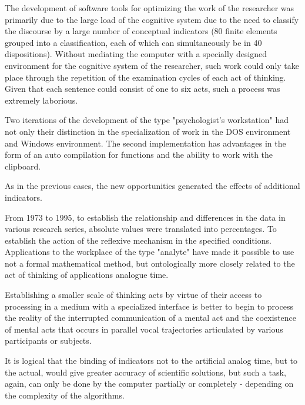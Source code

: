 \documentclass[conference]{IEEEtran}
\begin{document}
	The development of software tools for optimizing the work of the researcher was primarily due to the large load of the cognitive system due to the need to classify the discourse by a large number of conceptual indicators (80 finite elements grouped into a classification, each of which can simultaneously be in 40 dispositions). Without mediating the computer with a specially designed environment for the cognitive system of the researcher, such work could only take place through the repetition of the examination cycles of each act of thinking. Given that each sentence could consist of one to six acts, such a process was extremely laborious.
	
	Two iterations of the development of the type "psychologist's workstation" \cite{b7,b14} had not only their distinction in the specialization of work in the DOS environment and Windows environment. The second implementation has advantages in the form of an auto compilation for functions and the ability to work with the clipboard.
	
	As in the previous cases, the new opportunities generated the effects of additional indicators.
	
	From 1973 to 1995, to establish the relationship and differences in the data in various research series, absolute values were translated into percentages. To establish the action of the reflexive mechanism in the specified conditions. Applications to the workplace of the type "analyte" \cite{b1} have made it possible to use not a formal mathematical method, but ontologically more closely related to the act of thinking of applications analogue time.
	
	Establishing a smaller scale of thinking acts by virtue of their access to processing in a medium with a specialized interface is better to begin to process the reality of the interrupted communication of a mental act and the coexistence of mental acts that occurs in parallel vocal trajectories articulated by various participants or subjects.
	
	It is logical that the binding of indicators not to the artificial analog time, but to the actual, would give greater accuracy of scientific solutions, but such a task, again, can only be done by the computer partially or completely - depending on the complexity of the algorithms.
	
\end{document}
